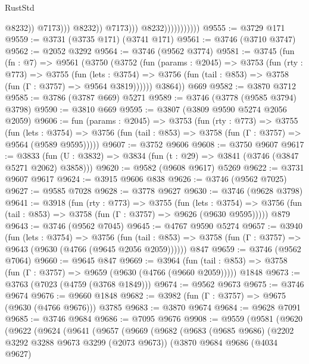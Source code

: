 \begin{lexlean}{RustStd}
\begin{coremodule}
                                              @8232))
                                          @7173)))
                                    @8232))
                                @7173)))
                          @8232)))))))))))
@9555 := @3729 @171
@9559 := @3731 (@3735 @171) (@3741 @171)
@9561 := @3746 (@3710 @3747)
@9562 := @2052 @3292
@9564 := @3746 (@9562 @3774)
@9581 := @3745
    (fun (fn : @7) =>
    @9561
      (@3750
        (@3752
          (fun (params : @2045) =>
          @3753
            (fun (rty : @773) =>
            @3755
              (fun (lets : @3754) =>
              @3756 (fun (tail : @853) => @3758 (fun (Γ : @3757) => @9564 @3819))))))
        @3864))
    @669
@9582 := @3870 @3712
@9585 := @3786 (@3787 @669) @5271
@9589 := @3746 (@3778 (@9585 @3794) @3798)
@9590 := @3810 @669
@9595 := @3807 (@3809 @9590 @5274 @2056 @2059)
@9606 := fun (params : @2045) =>
  @3753
    (fun (rty : @773) =>
    @3755
      (fun (lets : @3754) =>
      @3756 (fun (tail : @853) => @3758 (fun (Γ : @3757) => @9564 (@9589 @9595)))))
@9607 := @3752 @9606
@9608 := @3750 @9607
@9617 := @3833 (fun (U : @3832) => @3834 (fun (t : @29) => @3841 (@3746 (@3847 @5271 @2062) @3858)))
@9620 := @9582 (@9608 @9617) @5269
@9622 := @3731 @9607 @9617
@9624 := @3915 @9606 @838
@9626 := @3746 (@9562 @7025)
@9627 := @9585 @7028
@9628 := @3778 @9627
@9630 := @3746 (@9628 @3798)
@9641 := @3918
    (fun (rty : @773) =>
    @3755
      (fun (lets : @3754) =>
      @3756 (fun (tail : @853) => @3758 (fun (Γ : @3757) => @9626 (@9630 @9595)))))
    @879
@9643 := @3746 (@9562 @7045)
@9645 := @4767 @9590 @5274
@9657 := @3940
    (fun (lets : @3754) =>
    @3756
      (fun (tail : @853) => @3758 (fun (Γ : @3757) => @9643 (@9630 (@4766 (@9645 @2056 @2059))))))
    @847
@9659 := @3746 (@9562 @7064)
@9660 := @9645 @847
@9669 := @3964
    (fun (tail : @853) => @3758 (fun (Γ : @3757) => @9659 (@9630 (@4766 (@9660 @2059)))))
    @1848
@9673 := @3763 (@7023 (@4759 (@3768 @1849)))
@9674 := @9562 @9673
@9675 := @3746 @9674
@9676 := @9660 @1848
@9682 := @3982 (fun (Γ : @3757) => @9675 (@9630 (@4766 @9676))) @3785
@9683 := @3870 @9674
@9684 := @9628 @7091
@9685 := @3746 @9684
@9686 := @7095 @9676
@9908 := @9559
    (@9581
      (@9620
        (@9622
          (@9624
            (@9641
              (@9657
                (@9669
                  (@9682
                    (@9683
                      (@9685 @9686)
                      (@2202 @3292 @3288 @9673 @3299 (@2073 @9673))
                      (@3870
                        @9684
                        @9686
                        (@4034 @9627)

\end{coremodule}
\end{lexlean}
